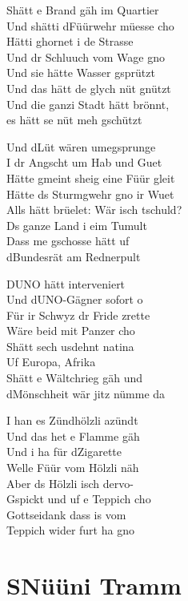 \documentclass[
  letterpaper,
  twoside=false]{scrbook}
\begin{document}
S\textquotesingle hätt e Brand gäh im Quartier\\
Und s\textquotesingle hätti d\textquotesingle Füürwehr müesse cho\\
Hätti ghornet i de Strasse\\
Und dr Schluuch vom Wage gno\\
Und sie hätte Wasser gsprützt\\
Und das hätt de glych nüt gnützt\\
Und die ganzi Stadt hätt brönnt,\\
es hätt se nüt meh gschützt

Und d\textquotesingle Lüt wären umegsprunge\\
I dr Angscht um Hab und Guet\\
Hätte gmeint s\textquotesingle heig eine Füür gleit\\
Hätte ds Sturmgwehr gno ir Wuet\\
Alls hätt brüelet: Wär isch tschuld?\\
Ds ganze Land i eim Tumult\\
Dass me gschosse hätt uf\\
d\textquotesingle Bundesrät am Rednerpult

D\textquotesingle UNO hätt interveniert\\
Und d\textquotesingle UNO-Gägner sofort o\\
Für ir Schwyz dr Fride z\textquotesingle rette\\
Wäre beid mit Panzer cho\\
S\textquotesingle hätt sech usdehnt natina\\
Uf Europa, Afrika\\
S\textquotesingle hätt e Wältchrieg gäh und\\
d\textquotesingle Mönschheit wär jitz nümme da

I han es Zündhölzli azündt\\
Und das het e Flamme gäh\\
Und i ha für d\textquotesingle Zigarette\\
Welle Füür vom Hölzli näh\\
Aber ds Hölzli isch dervo-\\
Gspickt und uf e Teppich cho\\
Gottseidank dass i\textquotesingle s vom\\
Teppich wider furt ha gno

\hypertarget{snuxfcuxfcni-tramm}{%
\chapter{S\textquotesingle Nüüni Tramm}\label{snuxfcuxfcni-tramm}}
\end{document}
